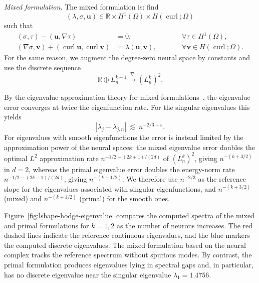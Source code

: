 \documentclass[pdflatex,sn-mathphys-num]{sn-jnl}
\numberwithin{equation}{section}
\numberwithin{theorem}{section}
\numberwithin{table}{section}
\numberwithin{figure}{section}
\begin{document}
\textit{Mixed formulation.}
The mixed formulation is: find
\[
(\lambda,\sigma,\boldsymbol u)\in
\mathbb R\times H^1(\Omega)\times H(\operatorname{curl};\Omega)
\]
such that
\[
\begin{aligned}
  (\sigma,\tau)-(\boldsymbol u,\nabla\tau)&=0,
  \qquad &&\forall \tau\in H^1(\Omega),\\
  (\nabla\sigma,\boldsymbol v)
  +
  (\operatorname{curl}\boldsymbol u,\operatorname{curl}\boldsymbol v)
  &=
  \lambda(\boldsymbol u,\boldsymbol v),
  \qquad &&\forall \boldsymbol v\in H(\operatorname{curl};\Omega).
  \end{aligned}
\]
For the same reason, we augment the
degree-zero neural space by constants and use the discrete sequence
\[
  \mathbb R\oplus L_n^{k+1}
  \xrightarrow{\nabla}
  (L_n^k)^2 .
\]

By the eigenvalue approximation theory for mixed
formulations~\cite{BABUSKA1991641,boffi2023convergence}, the
eigenvalue error converges at twice the eigenfunction rate. For the
singular eigenvalues this yields
\[
|\lambda_j-\lambda_{j,n}|
\ \lesssim\
n^{-2/3+\varepsilon} .
\]
For eigenvalues with smooth eigenfunctions the error is instead limited
by the approximation power of the neural spaces: the mixed eigenvalue
error doubles the optimal $L^2$ approximation rate
$n^{-1/2-(2k+1)/(2d)}$ of $(L_n^k)^2$, giving $n^{-(k+3/2)}$ in $d=2$,
whereas the primal eigenvalue error doubles the energy-norm rate
$n^{-1/2-(2k-1)/(2d)}$, giving $n^{-(k+1/2)}$.  We therefore use
$n^{-2/3}$ as the reference slope for the eigenvalues associated with
singular eigenfunctions, and $n^{-(k+3/2)}$ (mixed) and $n^{-(k+1/2)}$
(primal) for the smooth ones.

Figure~\ref{fig:lshape-hodge-eigenvalue} compares the computed spectra of
the mixed and primal formulations for \(k=1,2\) as the number of neurons
increases.  The red dashed lines indicate the reference continuous
eigenvalues, and the blue markers the computed discrete eigenvalues.  The
mixed formulation based on the neural complex tracks the reference
spectrum without spurious modes.  By contrast, the primal formulation
produces eigenvalues lying in spectral gaps and, in particular, has no
discrete eigenvalue near the singular eigenvalue
\(\lambda_1=1.4756\).
\end{document}

